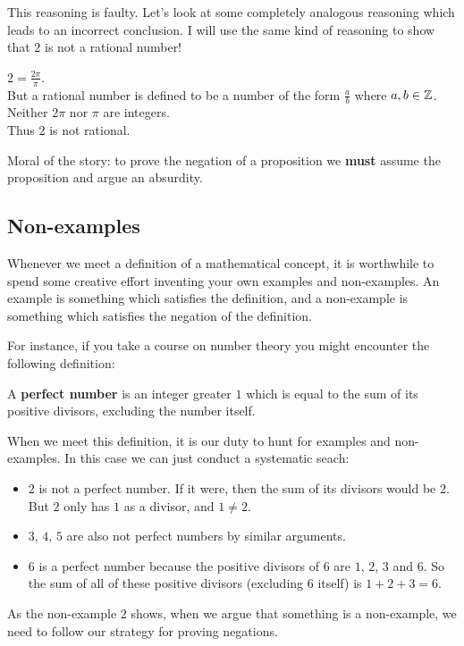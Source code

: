 \begin{example}
This reasoning is faulty.  Let's look at some completely analogous reasoning which leads to an incorrect conclusion.  I will use the same kind of reasoning to show that $2$ is not a rational number!

\begin{fitch*}
		\textrm{$2 = \frac{2\pi}{\pi}$.}\\
		\textrm{But a rational number is defined to be a number of the form  $\frac{a}{b}$ where $a,b \in \mathbb{Z}$.}\\
		\textrm{Neither $2\pi$ nor $\pi$ are integers.}\\
		\textrm{Thus $2$ is not rational.}
	\end{fitch*}

Moral of the story:  to prove the negation of a proposition we \textbf{must} assume the proposition and argue an absurdity.

\subsection{Non-examples}

Whenever we meet a definition of a mathematical concept, it is worthwhile to spend some creative effort inventing your own examples and non-examples.  An example is something which satisfies the definition, and a non-example is something which satisfies the negation of the definition.

For instance, if you take a course on number theory you might encounter the following definition:

\begin{definition}
		A \textbf{perfect number} is an integer greater $1$ which is equal to the sum of its positive divisors, excluding the number itself.
	\end{definition}

When we meet this definition, it is our duty to hunt for examples and non-examples.  In this case we can just conduct a systematic seach:

\begin{itemize}
		\item $2$ is not a perfect number.  If it were, then the sum of its divisors would be $2$.  But $2$ only has $1$ as a divisor, and $1 \neq 2$.
		\item $3$, $4$, $5$ are also not perfect numbers by similar arguments.
		\item $6$ is a perfect number because the positive divisors of $6$ are $1$, $2$, $3$ and $6$.  So the sum of all of these positive divisors (excluding $6$ itself) is $1+2+3 = 6$.
	\end{itemize}

As the non-example $2$ shows, when we argue that something is a non-example, we need to follow our strategy for proving negations.
	
	
	
	
	
	
	\end{example}







